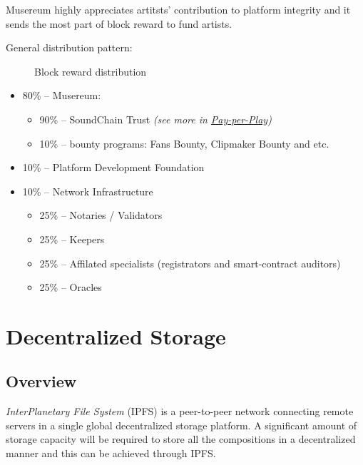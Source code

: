 \documentclass[12pt]{report}
\newcommand{\hlc}[1]{\colorbox{yellow!25}{#1}}
\begin{document}
Musereum highly appreciates artitsts' contribution to platform integrity and it sends the most part of block reward to fund artists.

General distribution pattern:

\def\Musereum{Musereum}
\def\Development{Platform Development}
\def\Infrastructure{Infrastructure}

\begin{figure}[H]
\centering
\caption{Block reward distribution}
\vspace{20pt}
\end{figure}

\begin{itemize}
	\item 80\% – Musereum:
	\begin{itemize}
		\item 90\% – SoundChain Trust \textit{(see more in \hyperref[tech-apps-soundchain-payperplay]{Pay-per-Play})}
		\item 10\% – bounty programs: Fans Bounty, Clipmaker Bounty and etc.
	\end{itemize}
	\item 10\% – Platform Development Foundation
	\item 10\% – \hlc{Network Infrastructure}
	\begin{itemize}
		\item 25\% – Notaries / Validators
		\item 25\% – \hlc{Keepers}
		\item 25\% – Affilated specialists (\hlc{registrators} and smart-contract auditors)
		\item 25\% – Oracles
	\end{itemize}
\end{itemize}

\section{Decentralized Storage}
\label{tech-storage}
\subsection{Overview}
\label{tech-storage-review}
\textit{InterPlanetary File System} (IPFS) is a peer-to-peer network connecting remote servers in a single global decentralized storage platform. A significant amount of storage capacity will be required to store all the compositions in a decentralized manner and this can be achieved through IPFS.
\end{document}
